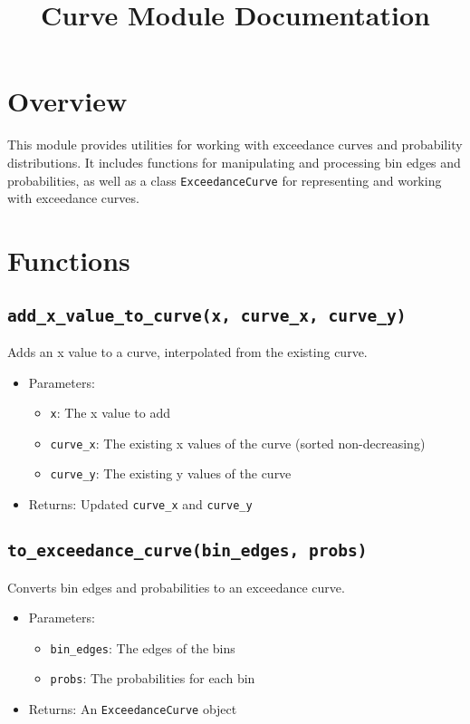 \documentclass{article}
\title{Curve Module Documentation}
\author{}
\date{}
\begin{document}
\maketitle

\section{Overview}

This module provides utilities for working with exceedance curves and probability distributions. It includes functions for manipulating and processing bin edges and probabilities, as well as a class \texttt{ExceedanceCurve} for representing and working with exceedance curves.

\section{Functions}

\subsection{\texttt{add\_x\_value\_to\_curve(x, curve\_x, curve\_y)}}

Adds an x value to a curve, interpolated from the existing curve.

\begin{itemize}
    \item Parameters:
    \begin{itemize}
        \item \texttt{x}: The x value to add
        \item \texttt{curve\_x}: The existing x values of the curve (sorted non-decreasing)
        \item \texttt{curve\_y}: The existing y values of the curve
    \end{itemize}
    \item Returns: Updated \texttt{curve\_x} and \texttt{curve\_y}
\end{itemize}

\subsection{\texttt{to\_exceedance\_curve(bin\_edges, probs)}}

Converts bin edges and probabilities to an exceedance curve.

\begin{itemize}
    \item Parameters:
    \begin{itemize}
        \item \texttt{bin\_edges}: The edges of the bins
        \item \texttt{probs}: The probabilities for each bin
    \end{itemize}
    \item Returns: An \texttt{ExceedanceCurve} object
\end{itemize}
\end{document}
